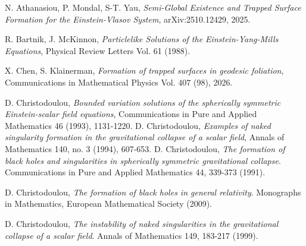 \documentclass{article}[11pt]
\numberwithin{equation}{section}
\begin{document}
\begin{thebibliography}{}
 N. Athanasiou, P. Mondal, S-T. Yau, \textit{Semi-Global Existence and Trapped Surface Formation for the Einstein-Vlasov System}, arXiv:2510.12429, 2025.

 R. Bartnik, J. McKinnon, \textit{Particlelike Solutions of the Einstein-Yang-Mills Equations}, Physical Review Letters Vol. 61 (1988).



 X. Chen, S. Klainerman, \textit{Formation of trapped surfaces in geodesic foliation}, Communications in Mathematical Physics Vol. 407 (98), 2026. 



 D. Christodoulou, \textit{Bounded variation solutions of the spherically symmetric Einstein-scalar field equations}, Communications in Pure and Applied Mathematics 46 (1993), 1131-1220. 
 D. Christodoulou, \textit{Examples of naked singularity formation in the gravitational collapse of a scalar field}, Annals of Mathematics 140, no. 3 (1994), 607-653. 
 D. Christodoulou, \textit{The formation of black holes and singularities in spherically symmetric gravitational collapse}. Communications in Pure and Applied Mathematics 44, 339-373 (1991).


 D. Christodoulou, \textit{The formation of black holes in general relativity}. Monographs in Mathematics, European Mathematical Society (2009).

 D. Christodoulou, \textit{The instability of naked singularities in the gravitational collapse of a scalar field}. Annals of Mathematics 149, 183-217 (1999).












\end{thebibliography}
\end{document}
